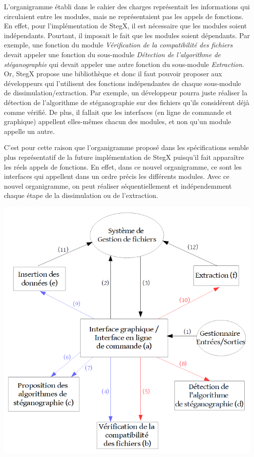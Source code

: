 \documentclass[11pt]{article}
\begin{document}
L'organigramme établi dans le cahier des charges représentait les informations 
qui circulaient entre les modules, mais ne représentaient pas les appels de 
fonctions. 
En effet, pour l'implémentation de StegX, il est nécessaire que les modules 
soient indépendants. Pourtant, il imposait le fait que les modules soient 
dépendants. Par exemple, une fonction du module 
\textit{Vérification de la compatibilité des fichiers} devait appeler une 
fonction du sous-module \textit{Détection de l'algorithme de stéganographie} 
qui devait appeler une autre fonction du sous-module \textit{Extraction}. 
Or, StegX propose une bibliothèque et donc il faut pouvoir proposer aux 
développeurs qui l'utilisent des fonctions indépendantes de chaque sous-module 
de dissimulation/extraction. 
Par exemple, un développeur pourra juste réaliser la détection de l'algorithme de 
stéganographie sur des fichiers qu'ils considérent déjà comme vérifié. 
De plus, il fallait que les interfaces (en ligne de commande et graphique) 
appellent elles-mêmes chacun des modules, et non qu'un module appelle un autre. 

C'est pour cette raison que l'organigramme proposé dans les spécifications 
semble plus représentatif de la future implémentation de StegX puisqu'il 
fait apparaître les réels appels de fonctions. 
En effet, dans ce nouvel organigramme, ce sont les interfaces qui appellent 
dans un ordre précis les différents modules. 
Avec ce nouvel organigramme, on peut réaliser séquentiellement et indépendemment 
chaque étape de la dissimulation ou de l'extraction. 
\newline

\includegraphics[scale=0.6]{pictures/organigramme2.png}
\newpage
\end{document}
